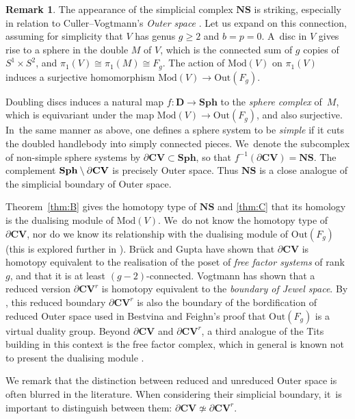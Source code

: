 \documentclass[11pt]{article}
\theoremstyle{plain}
\theoremstyle{definition}
\newtheorem{rem}[thm]{Remark}
\newcommand{\compNS}{\mathbf{NS}}
\newcommand{\compD}{\mathbf{D}}
\newcommand{\Sph}{\mathbf{Sph}}
\newcommand{\CV}{\mathbf{CV}}
\newcommand{\mcg}{\mathrm{Mod}}
\newcommand{\hmod}{\mathrm{Mod}}
\newcommand{\out}{\mathrm{Out}}
\begin{document}
\begin{rem}\label{rem: connection to outer space}
The appearance of the simplicial complex $\compNS$ is striking, especially in relation to Culler--Vogtmann's \emph{Outer space} \cite{cv}. Let us expand on this connection, assuming for simplicity that $V$ has genus $g\geq2$ and $b=p=0$. A~disc in $V$ gives rise to a sphere in the double $M$ of $V$, which is the connected sum of $g$ copies of $S^1 \times S^2$, and $\pi_1(V)\cong\pi_1(M)\cong F_g$. The action of $\mcg(V)$ on $\pi_1(V)$ induces a surjective homomorphism $\hmod(V) \to \out(F_g)$.

Doubling discs induces a natural map $f:\compD \to \Sph$ to the \emph{sphere complex} of~$M$, which is equivariant under the map $\hmod(V) \to \out(F_g)$, and also surjective. In~the same manner as above, one defines a sphere system to be \emph{simple} if it cuts the doubled handlebody into simply connected pieces. We~denote the subcomplex of non-simple sphere systems by $\partial \CV \subset \Sph$, so that $f^{-1}(\partial \CV) = \compNS$. The complement $\Sph \setminus\nobreak \partial \CV$ is precisely Outer space. Thus $\compNS$ is a close analogue of the simplicial boundary of Outer space.

Theorem~\ref{thm:B} gives the homotopy type of $\compNS$ and \cref{thm:C} that its homology is the dualising module of $\hmod(V)$. We~do not know the homotopy type of $\partial \CV$, nor do we know its relationship with the dualising module of $\out(F_g)$ (this is explored further in \cite{WW}). Brück and Gupta \cite[Th.\,2]{bruck-gupta} have shown that $\partial \CV$ is homotopy equivalent to the realisation of the poset of \emph{free factor systems} of rank $g$, and that it is at least $(g-2)$-connected. Vogtmann \cite{vogtmann} has shown that a reduced version $\partial \CV^r$ is homotopy equivalent to the \emph{boundary of Jewel space}. By \cite{bsv}, this reduced boundary $\partial \CV^r$ is also the boundary of the bordification of reduced Outer space used in Bestvina and Feighn's proof that $\out(F_g)$ is a virtual duality group. Beyond $\partial \CV$ and $\partial \CV^r$, a third analogue of the Tits building in this context is the free factor complex, which in general is known not to present the dualising module \cite{hmnp}.

We remark that the distinction between reduced and unreduced Outer space is often blurred in the literature. When considering their simplicial boundary, it~is important to distinguish between them: $\partial \CV \not\simeq \partial\CV^r $.
\end{rem}
\end{document}

